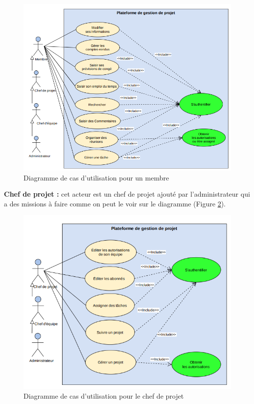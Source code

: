 \begin{figure}[h]
    \centering
    \includegraphics[scale=0.7]{figures/a9.png}
    \caption{Diagramme de cas d’utilisation pour un membre}
    \label{fig:cas_memb}
\end{figure}\newpage
\par \textbf{Chef de projet :} cet acteur est un chef de projet ajouté par l'administrateur qui a des missions à faire comme on peut le voir sur le diagramme (Figure \ref{fig:cas_chefp}).
\begin{figure}[h]
    \centering
    \includegraphics[scale=0.7]{figures/a1.png}
    \caption{Diagramme de cas d’utilisation pour le chef de projet}
    \label{fig:cas_chefp}
\end{figure}
